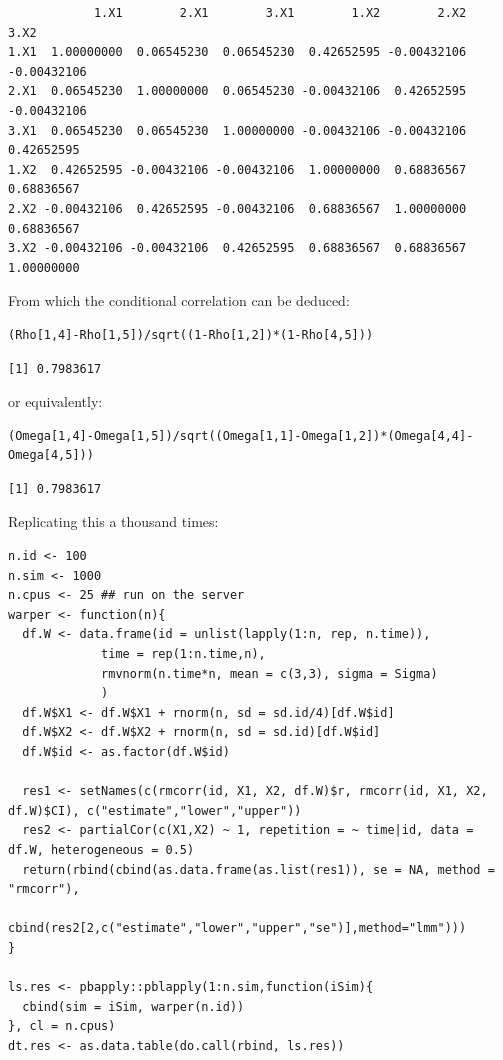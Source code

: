 \documentclass[12pt]{article}
\begin{document}
\begin{verbatim}
            1.X1        2.X1        3.X1        1.X2        2.X2        3.X2
1.X1  1.00000000  0.06545230  0.06545230  0.42652595 -0.00432106 -0.00432106
2.X1  0.06545230  1.00000000  0.06545230 -0.00432106  0.42652595 -0.00432106
3.X1  0.06545230  0.06545230  1.00000000 -0.00432106 -0.00432106  0.42652595
1.X2  0.42652595 -0.00432106 -0.00432106  1.00000000  0.68836567  0.68836567
2.X2 -0.00432106  0.42652595 -0.00432106  0.68836567  1.00000000  0.68836567
3.X2 -0.00432106 -0.00432106  0.42652595  0.68836567  0.68836567  1.00000000
\end{verbatim}


From which the conditional correlation can be deduced:
\lstset{language=r,label= ,caption= ,captionpos=b,numbers=none}
\begin{lstlisting}
(Rho[1,4]-Rho[1,5])/sqrt((1-Rho[1,2])*(1-Rho[4,5]))
\end{lstlisting}

\begin{verbatim}
[1] 0.7983617
\end{verbatim}


or equivalently:
\lstset{language=r,label= ,caption= ,captionpos=b,numbers=none}
\begin{lstlisting}
(Omega[1,4]-Omega[1,5])/sqrt((Omega[1,1]-Omega[1,2])*(Omega[4,4]-Omega[4,5]))
\end{lstlisting}

\begin{verbatim}
[1] 0.7983617
\end{verbatim}


Replicating this a thousand times:
\lstset{language=r,label= ,caption= ,captionpos=b,numbers=none}
\begin{lstlisting}
n.id <- 100
n.sim <- 1000
n.cpus <- 25 ## run on the server
warper <- function(n){ 
  df.W <- data.frame(id = unlist(lapply(1:n, rep, n.time)),
		     time = rep(1:n.time,n),
		     rmvnorm(n.time*n, mean = c(3,3), sigma = Sigma)
		     )
  df.W$X1 <- df.W$X1 + rnorm(n, sd = sd.id/4)[df.W$id]
  df.W$X2 <- df.W$X2 + rnorm(n, sd = sd.id)[df.W$id]
  df.W$id <- as.factor(df.W$id)

  res1 <- setNames(c(rmcorr(id, X1, X2, df.W)$r, rmcorr(id, X1, X2, df.W)$CI), c("estimate","lower","upper"))
  res2 <- partialCor(c(X1,X2) ~ 1, repetition = ~ time|id, data = df.W, heterogeneous = 0.5)
  return(rbind(cbind(as.data.frame(as.list(res1)), se = NA, method = "rmcorr"),
	       cbind(res2[2,c("estimate","lower","upper","se")],method="lmm")))
}

ls.res <- pbapply::pblapply(1:n.sim,function(iSim){
  cbind(sim = iSim, warper(n.id))
}, cl = n.cpus)
dt.res <- as.data.table(do.call(rbind, ls.res))
\end{lstlisting}
\end{document}
